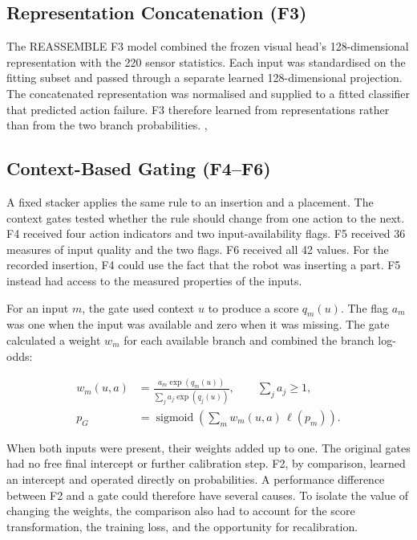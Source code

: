 \subsection{Representation Concatenation (F3)}
The REASSEMBLE F3 model combined the frozen visual head's 128-dimensional
representation with the 220 sensor statistics. Each input was standardised on the
fitting subset and passed through a separate learned 128-dimensional projection.
The concatenated representation was normalised and supplied to a fitted classifier
that predicted action failure. F3 therefore learned from representations rather than
from the two branch probabilities.
{, }

\subsection{Context-Based Gating (F4--F6)}
\label{sec:ch3-context-gating}

A fixed stacker applies the same rule to an insertion and a placement. The context gates
tested whether the rule should change from one action to the next. F4 received four
action indicators and two input-availability flags. F5 received 36 measures of input
quality and the two flags. F6 received all 42 values. For the recorded insertion, F4
could use the fact that the robot was inserting a part. F5 instead had access to the
measured properties of the inputs.

For an input \(m\), the gate used context \(u\) to produce a score \(q_m(u)\). The flag
\(a_m\) was one when the input was available and zero when it was missing. The gate
calculated a weight \(w_m\) for each available branch and combined the branch log-odds:

\begin{equation}
\begin{aligned}
w_m(u,a)&=\frac{a_m\exp(q_m(u))}{\sum_j a_j\exp(q_j(u))},
\qquad \sum_j a_j\geq 1,\\
p_G&=\operatorname{sigmoid}\!\left(\sum_m w_m(u,a)\,\ell(p_m)\right).
\end{aligned}
\label{eq:gate}
\end{equation}

When both inputs were present, their weights added up to one. The original gates had no
free final intercept or further calibration step. F2, by comparison, learned an
intercept and operated directly on probabilities. A performance difference between F2
and a gate could therefore have several causes. To isolate the value of changing the
weights, the comparison also had to account for the score transformation, the training
loss, and the opportunity for recalibration.

